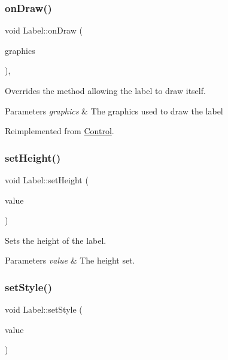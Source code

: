 \subsubsection{\texorpdfstring{onDraw()}{onDraw()}}
{\footnotesize\ttfamily void Label\+::on\+Draw (\begin{DoxyParamCaption}\item[{\mbox{\hyperlink{class_ref}{Ref}}$<$ \mbox{\hyperlink{class_graphics}{Graphics}} $>$ \&}]{graphics }\end{DoxyParamCaption})\hspace{0.3cm}{\ttfamily [override]}, {\ttfamily [virtual]}}



Overrides the method allowing the label to draw itself. 


\begin{DoxyParams}{Parameters}
{\em graphics} & The graphics used to draw the label\\
\hline
\end{DoxyParams}


Reimplemented from \mbox{\hyperlink{class_control_a5f89270d0d05a6bac9128db0b1d290d2}{Control}}.

\mbox{\label{class_label_ac97689cc2fa667ef92da9904b1679fd5}} 
\subsubsection{\texorpdfstring{setHeight()}{setHeight()}}
{\footnotesize\ttfamily void Label\+::set\+Height (\begin{DoxyParamCaption}\item[{int}]{value }\end{DoxyParamCaption})}



Sets the height of the label. 


\begin{DoxyParams}{Parameters}
{\em value} & The height set.\\
\hline
\end{DoxyParams}
\mbox{\label{class_label_a8b4c56829c676960e9bb9000eaa83963}} 
\subsubsection{\texorpdfstring{setStyle()}{setStyle()}}
{\footnotesize\ttfamily void Label\+::set\+Style (\begin{DoxyParamCaption}\item[{Console\+Style}]{value }\end{DoxyParamCaption})}



